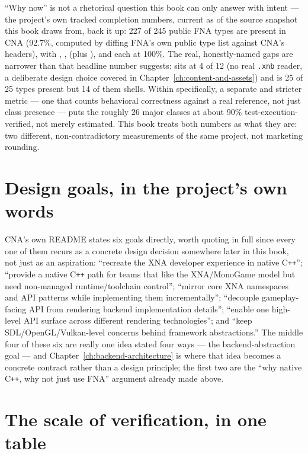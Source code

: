 ``Why now'' is not a rhetorical question this book can only answer with intent --- the
project's own tracked completion numbers, current as of the source snapshot this book draws
from, back it up: 227 of 245 public FNA types are present in CNA (92.7\%, computed by diffing
FNA's own public type list against CNA's headers), with , ,
 (plus ), and  each at 100\%. The real, honestly-named
gaps are narrower than that headline number suggests:  sits at 4 of 12 (no real
\texttt{.xnb} reader, a deliberate design choice covered in
Chapter~\ref{ch:content-and-assets}) and  is 25 of 25 types present but 14 of them
shells. Within  specifically, a separate and stricter metric --- one that counts
behavioral correctness against a real reference, not just class presence --- puts the roughly 26
major classes at about 90\% test-execution-verified, not merely estimated. This book treats
both numbers as what they are: two different, non-contradictory measurements of the same
project, not marketing rounding.

\section{Design goals, in the project's own words}

CNA's own README states six goals directly, worth quoting in full since every one of them
recurs as a concrete design decision somewhere later in this book, not just as an aspiration:
``recreate the XNA developer experience in native C\texttt{++}''; ``provide a native
C\texttt{++} path for teams that like the XNA/MonoGame model but need non-managed
runtime/toolchain control''; ``mirror core XNA namespaces and API patterns while implementing
them incrementally''; ``decouple gameplay-facing API from rendering backend implementation
details''; ``enable one high-level API surface across different rendering technologies''; and
``keep SDL/OpenGL/Vulkan-level concerns behind framework abstractions.'' The middle four of
these six are really one idea stated four ways --- the backend-abstraction goal --- and
Chapter~\ref{ch:backend-architecture} is where that idea becomes a concrete
 contract rather than a design principle; the first two are the
``why native C\texttt{++}, why not just use FNA'' argument already made above.

\section{The scale of verification, in one table}

